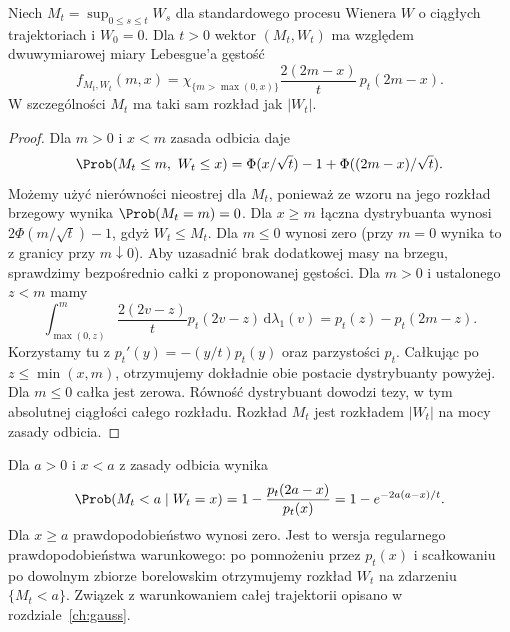 \begin{wniosek}
\label{cor:wiener-max-joint}
Niech $M_t=\sup_{0\le s\le t}W_s$ dla standardowego
procesu Wienera $W$ o ciągłych trajektoriach i $W_0=0$.
Dla $t>0$ wektor $(M_t,W_t)$ ma względem
dwuwymiarowej miary Lebesgue'a gęstość
\[
f_{M_t,W_t}(m,x)=
\chi_{\{m>\max(0,x)\}}\frac{2(2m-x)}{t}\,p_t(2m-x).
\]
W szczególności $M_t$ ma taki sam rozkład jak $|W_t|$.
\end{wniosek}
\begin{proof}
Dla $m>0$ i $x<m$ zasada odbicia daje
\[
\Prob(M_t\le m,\ W_t\le x)
=\Phi(x/\sqrt t)-1+\Phi((2m-x)/\sqrt t).
\]
Możemy użyć nierówności nieostrej dla $M_t$,
ponieważ ze wzoru na jego rozkład brzegowy
wynika $\Prob(M_t=m)=0$. Dla $x\ge m$
łączna dystrybuanta wynosi
$2\Phi(m/\sqrt t)-1$, gdyż $W_t\le M_t$.
Dla $m\le0$ wynosi zero (przy $m=0$ wynika to
z granicy przy $m\downarrow0$).
Aby uzasadnić brak dodatkowej masy na brzegu,
sprawdzimy bezpośrednio całki z proponowanej gęstości.
Dla $m>0$ i ustalonego $z<m$ mamy
\[
\int_{\max(0,z)}^m
\frac{2(2v-z)}{t}p_t(2v-z)\,\mathrm d\lambda_1(v)
=p_t(z)-p_t(2m-z).
\]
Korzystamy tu z $p_t'(y)=-(y/t)p_t(y)$
oraz parzystości $p_t$. Całkując po
$z\le\min(x,m)$, otrzymujemy dokładnie obie
postacie dystrybuanty powyżej.
Dla $m\le0$ całka jest zerowa. Równość dystrybuant
dowodzi tezy, w tym absolutnej ciągłości całego
rozkładu. Rozkład $M_t$ jest rozkładem $|W_t|$
na mocy zasady odbicia.
\end{proof}

\begin{przyklad}
Dla $a>0$ i $x<a$ z zasady odbicia wynika
\[
\Prob(M_t<a\mid W_t=x)
=1-\frac{p_t(2a-x)}{p_t(x)}
=1-e^{-2a(a-x)/t}.
\]
Dla $x\ge a$ prawdopodobieństwo wynosi zero.
Jest to wersja regularnego prawdopodobieństwa
warunkowego: po pomnożeniu przez $p_t(x)$
i scałkowaniu po dowolnym zbiorze borelowskim
otrzymujemy rozkład $W_t$ na zdarzeniu $\{M_t<a\}$.
Związek z warunkowaniem całej trajektorii opisano
w rozdziale~\ref{ch:gauss}.
\end{przyklad}

